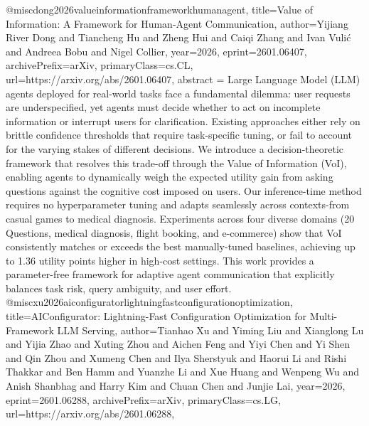 {}@misc{dong2026valueinformationframeworkhumanagent,
      title={Value of Information: A Framework for Human-Agent Communication}, 
      author={Yijiang River Dong and Tiancheng Hu and Zheng Hui and Caiqi Zhang and Ivan Vulić and Andreea Bobu and Nigel Collier},
      year={2026},
      eprint={2601.06407},
      archivePrefix={arXiv},
      primaryClass={cs.CL},
      url={https://arxiv.org/abs/2601.06407},
      abstract = {Large Language Model (LLM) agents deployed for real-world tasks face a fundamental dilemma: user requests are underspecified, yet agents must decide whether to act on incomplete information or interrupt users for clarification. Existing approaches either rely on brittle confidence thresholds that require task-specific tuning, or fail to account for the varying stakes of different decisions. We introduce a decision-theoretic framework that resolves this trade-off through the Value of Information (VoI), enabling agents to dynamically weigh the expected utility gain from asking questions against the cognitive cost imposed on users. Our inference-time method requires no hyperparameter tuning and adapts seamlessly across contexts-from casual games to medical diagnosis. Experiments across four diverse domains (20 Questions, medical diagnosis, flight booking, and e-commerce) show that VoI consistently matches or exceeds the best manually-tuned baselines, achieving up to 1.36 utility points higher in high-cost settings. This work provides a parameter-free framework for adaptive agent communication that explicitly balances task risk, query ambiguity, and user effort.}
}@misc{xu2026aiconfiguratorlightningfastconfigurationoptimization,
      title={AIConfigurator: Lightning-Fast Configuration Optimization for Multi-Framework LLM Serving}, 
      author={Tianhao Xu and Yiming Liu and Xianglong Lu and Yijia Zhao and Xuting Zhou and Aichen Feng and Yiyi Chen and Yi Shen and Qin Zhou and Xumeng Chen and Ilya Sherstyuk and Haorui Li and Rishi Thakkar and Ben Hamm and Yuanzhe Li and Xue Huang and Wenpeng Wu and Anish Shanbhag and Harry Kim and Chuan Chen and Junjie Lai},
      year={2026},
      eprint={2601.06288},
      archivePrefix={arXiv},
      primaryClass={cs.LG},
      url={https://arxiv.org/abs/2601.06288},
}
